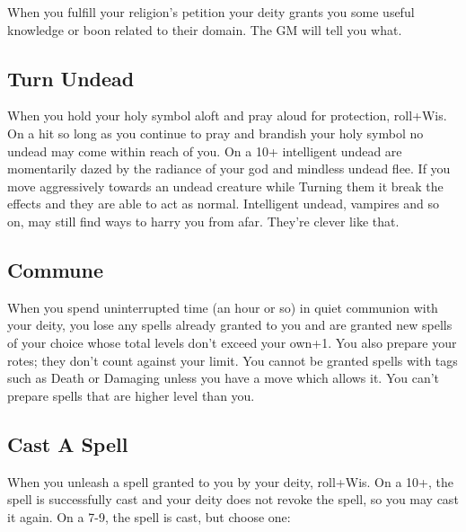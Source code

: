 When you fulfill your religion’s petition your deity grants you some useful knowledge or boon related to their domain. The GM will tell you what.

           

           

             
\subsection{Turn Undead}    
             

When you hold your holy symbol aloft and pray aloud for protection, roll+Wis. On a hit so long as you continue to pray and brandish your holy symbol no undead may come within reach of you. On a 10+ intelligent undead are momentarily dazed by the radiance of your god and mindless undead flee. If you move aggressively towards an undead creature while Turning them it break the effects and they are able to act as normal. Intelligent undead, vampires and so on, may still find ways to harry you from afar. They're clever like that.

           

           

             
\subsection{Commune}   
             

When you spend uninterrupted time (an hour or so) in quiet communion with your deity, you lose any spells already granted to you and are granted new spells of your choice whose total levels don't exceed your own+1. You also prepare your rotes; they don't count against your limit. You cannot be granted spells with tags such as Death or Damaging unless you have a move which allows it. You can't prepare spells that are higher level than you.

           

           

             
\subsection{Cast A Spell}    
             

When you unleash a spell granted to you by your deity, roll+Wis. On a 10+, the spell is successfully cast and your deity does not revoke the spell, so you may cast it again. On a 7-9, the spell is cast, but choose one:

